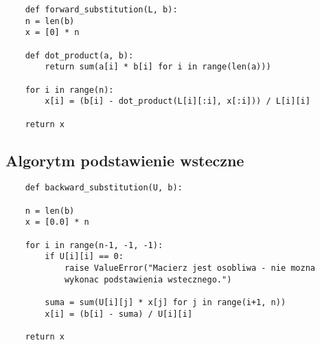 \documentclass{article}
\begin{document}
\begin{lstlisting}
    def forward_substitution(L, b):
    n = len(b)
    x = [0] * n
    
    def dot_product(a, b):
        return sum(a[i] * b[i] for i in range(len(a)))
    
    for i in range(n):
        x[i] = (b[i] - dot_product(L[i][:i], x[:i])) / L[i][i]
    
    return x
\end{lstlisting}
\subsection{Algorytm podstawienie wsteczne}
\begin{lstlisting}
    def backward_substitution(U, b):

    n = len(b)
    x = [0.0] * n  
    
    for i in range(n-1, -1, -1):
        if U[i][i] == 0:
            raise ValueError("Macierz jest osobliwa - nie mozna 
            wykonac podstawienia wstecznego.")
        
        suma = sum(U[i][j] * x[j] for j in range(i+1, n))
        x[i] = (b[i] - suma) / U[i][i]
    
    return x
\end{lstlisting}
\end{document}
